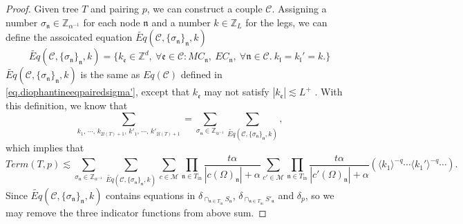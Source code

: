 \begin{proof}
Given tree $T$ and pairing $p$, we can construct a couple $\mathcal{C}$. Assigning a number $\sigma_{\mathfrak{n}}\in \mathbb{Z}_{\alpha^{-1}}$ for each node $\mathfrak{n}$ and a number $k\in \mathbb{Z}_{L}$ for the legs, we can define the assoicated equation $\widetilde{Eq}(\mathcal{C}, \{\sigma_{\mathfrak{n}}\}_{\mathfrak{n}},k)$
\begin{equation}
    \widetilde{Eq}(\mathcal{C}, \{\sigma_{\mathfrak{n}}\}_{\mathfrak{n}},k)=\{k_{\mathfrak{e}}\in \mathbb{Z}^d,\ \forall \mathfrak{e}\in \mathcal{C}:MC_{\mathfrak{n}},\  EC_{\mathfrak{n}},\ \forall \mathfrak{n}\in \mathcal{C}.\ k_{\mathfrak{l}}=k_{\mathfrak{l}}'=k.\}
\end{equation}
$\widetilde{Eq}(\mathcal{C}, \{\sigma_{\mathfrak{n}}\}_{\mathfrak{n}},k)$ is the same as $Eq(\mathcal{C})$ defined in \eqref{eq.diophantineeqpairedsigma'}, except that $k_{\mathfrak{e}}$ may not satisfy $|k_{\mathfrak{e}}| \lesssim L^+$ . With this definition, we know that 
\begin{equation}
    \sum_{k_1,\, \cdots,\, k_{2l(T)+1},\, k'_1,\, \cdots,\, k'_{2l(T)+1}}=\sum_{\sigma_{\mathfrak{n}}\in \mathbb{Z}_{\alpha^{-1}}}\sum_{\widetilde{Eq}(\mathcal{C}, \{\sigma_{\mathfrak{n}}\}_{\mathfrak{n}},k)},
\end{equation}
which implies that
\begin{equation}
    Term(T, p)\lesssim \sum_{\sigma_{\mathfrak{n}}\in \mathbb{Z}_{\alpha^{-1}}}\sum_{\widetilde{Eq}(\mathcal{C}, \{\sigma_{\mathfrak{n}}\}_{\mathfrak{n}},k)} \sum_{c\in \mathscr{M} }\prod_{\mathfrak{n}\in T_{\text{in}}}\frac{t\alpha}{|c(\Omega)_{\mathfrak{n}}|+\alpha} \sum_{c'\in \mathscr{M}}\prod_{\mathfrak{n}\in T_{\text{in}}}\frac{t\alpha}{|c'(\Omega)_{\mathfrak{n}}|+\alpha} \left(\langle k_1\rangle^{-q}\cdots\langle k_1'\rangle^{-q}\cdots\right).
\end{equation}
Since $\widetilde{Eq}(\mathcal{C}, \{\sigma_{\mathfrak{n}}\}_{\mathfrak{n}},k)$ contains equations in $\delta_{\cap_{\mathfrak{n}\in T_{\text{in}}} S_{\mathfrak{n}}}$, $\delta_{\cap_{\mathfrak{n}\in T_{\text{in}}} S'_{\mathfrak{n}}}$ and $\delta_{p}$, so we may remove the three indicator functions from above sum.


\end{proof}
